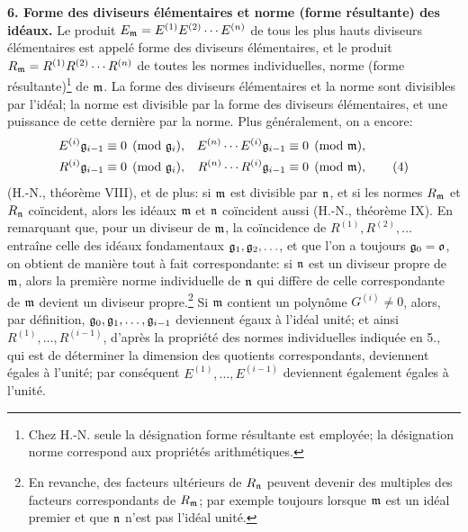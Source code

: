 \textbf{6. Forme des diviseurs élémentaires et norme (forme résultante) des idéaux.} Le produit $E_\mathfrak m=E^{(1)}E^{(2)}\cdots E^{(n)}$ de tous les plus hauts diviseurs élémentaires est appelé forme des diviseurs élémentaires, et le produit $R_\mathfrak m=R^{(1)}R^{(2)}\cdots R^{(n)}$ de toutes les normes individuelles, norme (forme résultante)\footnote{Chez H.-N. seule la désignation forme résultante est employée; la désignation norme correspond aux propriétés arithmétiques.} de $\mathfrak m$. La forme des diviseurs élémentaires et la norme sont divisibles par l'idéal; la norme est divisible par la forme des diviseurs élémentaires, et une puissance de cette dernière par la norme. Plus généralement, on a encore:
\begin{align}
 E^{(i)}\mathfrak g_{i-1}&\equiv0\pmod{\mathfrak g_i},
& E^{(n)}\cdots E^{(i)}\mathfrak g_{i-1}&\equiv0\pmod{\mathfrak m},\notag\\
 R^{(i)}\mathfrak g_{i-1}&\equiv0\pmod{\mathfrak g_i},
& R^{(n)}\cdots R^{(i)}\mathfrak g_{i-1}&\equiv0\pmod{\mathfrak m}, \tag{4}
\end{align}
(H.-N., théorème VIII), et de plus: si $\mathfrak m$ est divisible par $\mathfrak n$, et si les normes $R_\mathfrak m$ et $R_\mathfrak n$ coïncident, alors les idéaux $\mathfrak m$ et $\mathfrak n$ coïncident aussi (H.-N., théorème IX). En remarquant que, pour un diviseur de $\mathfrak m$, la coïncidence de $R^{(1)},R^{(2)},\ldots$ entraîne celle des idéaux fondamentaux $\mathfrak g_1,\mathfrak g_2,\ldots$, et que l'on a toujours $\mathfrak g_0=\mathfrak o$, on obtient de manière tout à fait correspondante: si $\mathfrak n$ est un diviseur propre de $\mathfrak m$, alors la première norme individuelle de $\mathfrak n$ qui diffère de celle correspondante de $\mathfrak m$ devient un diviseur propre.\footnote{En revanche, des facteurs ultérieurs de $R_\mathfrak n$ peuvent devenir des multiples des facteurs correspondants de $R_\mathfrak m$; par exemple toujours lorsque $\mathfrak m$ est un idéal premier et que $\mathfrak n$ n'est pas l'idéal unité.} Si $\mathfrak m$ contient un polynôme $G^{(i)}\ne0$, alors, par définition, $\mathfrak g_0,\mathfrak g_1,\ldots,\mathfrak g_{i-1}$ deviennent égaux à l'idéal unité; et ainsi $R^{(1)},\ldots,R^{(i-1)}$, d'après la propriété des normes individuelles indiquée en 5., qui est de déterminer la dimension des quotients correspondants, deviennent égales à l'unité; par conséquent $E^{(1)},\ldots,E^{(i-1)}$ deviennent également égales à l'unité.


